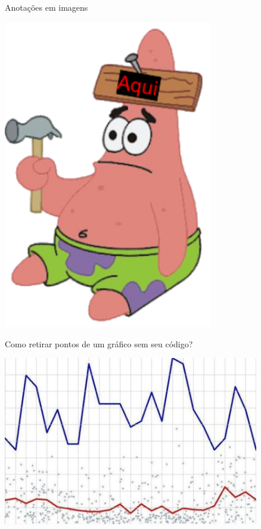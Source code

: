 \documentclass[
  ignorenonframetext,
]{beamer}
\begin{document}
\begin{frame}{Anotações em imagens}
\protect\hypertarget{anotauxe7uxf5es-em-imagens-1}{}

\includegraphics[width=3.6in]{patrik_anot}

\begin{center}
\tiny{}
\end{center}

\end{frame}

\begin{frame}{Como retirar pontos de um gráfico sem seu código?}
\protect\hypertarget{como-retirar-pontos-de-um-gruxe1fico-sem-seu-cuxf3digo}{}

\includegraphics[width=4.4in]{IMAGENS/grafico_ponto}

\begin{center}
\tiny{}
\end{center}

\end{frame}
\end{document}
